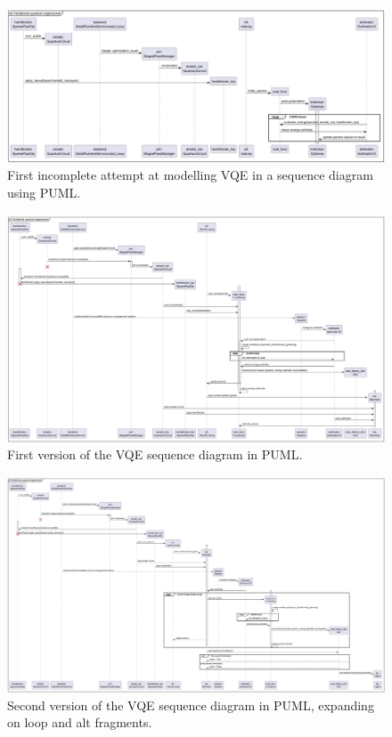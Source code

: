 \documentclass{article}
\begin{document}
\begin{figure}[H]
    \centering
    \includegraphics[width=1\linewidth]{vqe_sd_v1.png}
    \caption{First incomplete attempt at modelling VQE in a sequence diagram using PUML.}
    \label{fig:vqe_sd_v1}
\end{figure}

\begin{figure}[H]
    \centering
    \includegraphics[width=1\linewidth]{vqe_quml_sd_v1.png}
    \caption{First version of the VQE sequence diagram in PUML.}
    \label{fig:vqe_quml_sd_v1}
\end{figure}

\begin{figure}[H]
    \centering
    \includegraphics[width=1\linewidth]{vqe_quml_sd_v2.png}
    \caption{Second version of the VQE sequence diagram in PUML, expanding on loop and alt fragments.}
    \label{fig:vqe_quml_sd_v2}
\end{figure}
\end{document}

